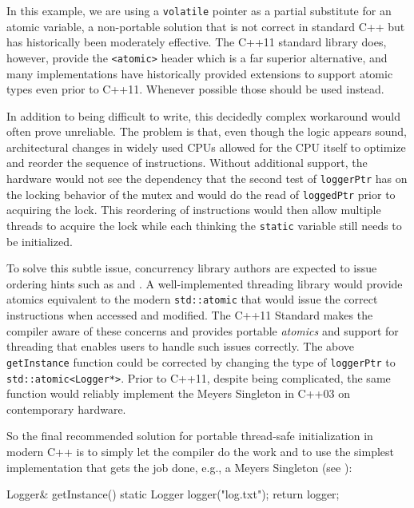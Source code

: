 \noindent In this example, we are using a \lstinline!volatile! pointer
as a partial
substitute for an atomic variable, a non-portable solution that is not correct
in standard C++ but has historically been moderately effective.  The C++11 standard
library does, however, provide the \lstinline!<atomic>! header which is a far superior alternative,
and many implementations have historically
provided extensions to support atomic types even prior to C++11.  Whenever possible those
should be used instead.

In addition to
being difficult to write, this decidedly complex workaround would often
prove unreliable. The problem is that, even though the logic appears
sound, architectural changes in widely used CPUs allowed for the CPU
itself to optimize and reorder the sequence of instructions. Without
additional support, the hardware would not see the dependency that the
second test of \lstinline!loggerPtr! has on the locking behavior of the
mutex and would do the read of \lstinline!loggedPtr! prior to acquiring the
lock. This reordering of instructions
would then allow multiple threads to acquire the lock while each thinking the
\lstinline!static! variable still needs to be initialized.

To solve this subtle issue, concurrency library authors are expected to
issue ordering hints such as  and . A
well-implemented threading library would provide atomics equivalent to
the modern \lstinline!std::atomic! that would issue the correct
instructions when accessed and modified. The C++11 Standard makes the
compiler aware of these concerns and provides portable \emph{atomics}
and support for threading that enables users to handle such issues
correctly. The above \lstinline!getInstance! function could be corrected by
changing the type of \lstinline!loggerPtr! to
\lstinline!std::atomic<Logger*>!. Prior to C++11, despite being
complicated, the same function would reliably implement the Meyers
Singleton in C++03 on contemporary hardware.

\enlargethispage*{2ex} %
So the final recommended solution for portable thread-safe
initialization in modern C++ is to simply let the compiler do the work
and to use the simplest implementation that gets the job done, e.g., a
Meyers Singleton (see ):

\begin{emcppslisting}[emcppsbatch=e17]
Logger& getInstance()
{
    static Logger logger("log.txt");
    return logger;
}
\end{emcppslisting}


